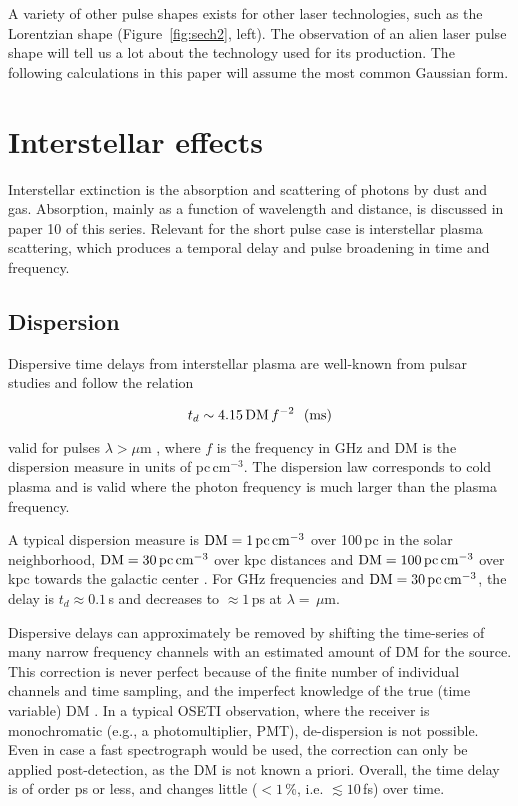 \documentclass[twocolumn,tighten,longauthor]{myaastex62}
\begin{document}
A variety of other pulse shapes exists for other laser technologies, such as the Lorentzian shape (Figure~\ref{fig:sech2}, left). The observation of an alien laser pulse shape will tell us a lot about the technology used for its production. The following calculations in this paper will assume the most common Gaussian form.


\section{Interstellar effects}
\label{sec:interstellar}
Interstellar extinction is the absorption and scattering of photons by dust and gas. Absorption, mainly as a function of wavelength and distance, is discussed in paper 10 of this series. Relevant for the short pulse case is interstellar plasma scattering, which produces a temporal delay and pulse broadening in time and frequency.


\subsection{Dispersion}
\label{sub:interstellar_dispersion}
Dispersive time delays from interstellar plasma are well-known from pulsar studies and follow the relation \citep{1993ApJ...411..674T}

\begin{equation}
t_d \sim 4.15\,{\rm DM}\,f^{-2}  \,\,\,\, {\rm (ms)}
\end{equation}

valid for pulses $\lambda>\mu$m \citep{2011AcAau..68..366S}, where $f$ is the frequency in GHz and DM is the dispersion measure in units of pc\,cm$^{-3}$. The dispersion law corresponds to cold plasma and is valid where the photon frequency is much larger than the plasma frequency.

A typical dispersion measure is $\rm{DM}=1\,{\rm pc\,cm}^{-3}$ over 100\,pc in the solar neighborhood, ${\rm DM}=30\, {\rm pc\,cm}^{-3}$ over kpc distances and $\rm{DM}=100\,{\rm pc\,cm}^{-3}$ over kpc towards the galactic center \citep{2017ApJ...835...29Y}. For GHz frequencies and ${\rm DM}=30\,{\rm pc\,cm}^{-3}$, the delay is $t_d\approx0.1\,$s and decreases to $\approx1\,$ps at $\lambda=\,\mu$m.

Dispersive delays can approximately be removed by shifting the time-series of many narrow frequency channels with an estimated amount of DM for the source. This correction is never perfect because of the finite number of individual channels and time sampling, and the imperfect knowledge of the true (time variable) DM \citep{alder2012radio}. In a typical OSETI observation, where the receiver is monochromatic (e.g., a photomultiplier, PMT), de-dispersion is not possible. Even in case a fast spectrograph would be used, the correction can only be applied post-detection, as the DM is not known a priori. Overall, the time delay is of order ps or less, and changes little ($<1\,$\%, i.e. $\lesssim10\,$fs) over time.
\end{document}
